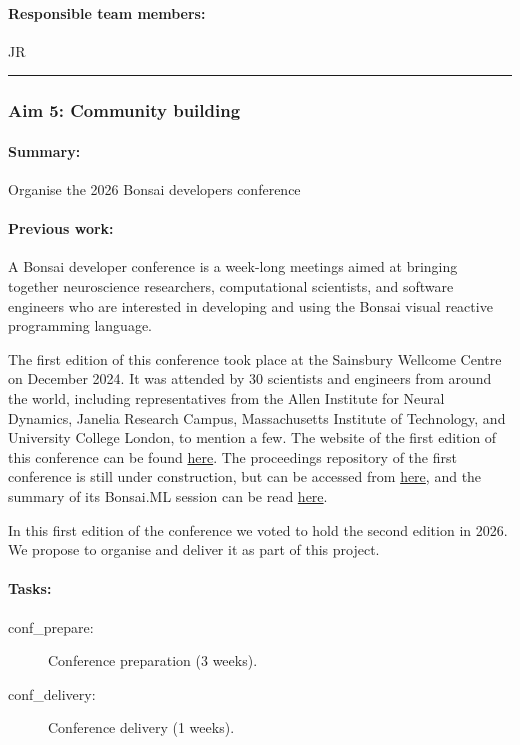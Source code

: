 \paragraph{Responsible team members:} JR

\noindent\rule{\textwidth}{1pt}
\subsubsection{Aim 5: Community building}
\paragraph{Summary:} Organise the 2026 Bonsai developers conference

\paragraph{Previous work:} A Bonsai developer conference is a week-long
meetings aimed at bringing together neuroscience researchers, computational
scientists, and software engineers who are interested in developing and using
the Bonsai visual reactive programming language.

The first edition of this conference took place at the Sainsbury Wellcome
Centre on December 2024. It was attended by 30 scientists and engineers from
around the world, including representatives from the Allen Institute for Neural
Dynamics, Janelia Research Campus, Massachusetts Institute of Technology, and
University College London, to mention a few.
%
The website of the first edition of this conference  can be found
\href{https://conference.bonsai-rx.org/2024/}{here}.  The proceedings
repository of the first conference is still under construction, but can be
accessed from
\href{https://github.com/joacorapela/bonsaiConference2024Proceedings}{here},
and the summary of its Bonsai.ML session can be read
\href{https://github.com/joacorapela/bonsaiConference2024Proceedings/blob/master/sessions/machineLearning/README.md}{here}.

In this first edition of the conference we voted to hold the second edition in
2026. We propose to organise and deliver it as part of this project.

\paragraph{Tasks:}

\begin{description}

    \item[conf\_prepare:] Conference preparation (3 weeks).
    \item[conf\_delivery:] Conference delivery (1 weeks).

\end{description}


